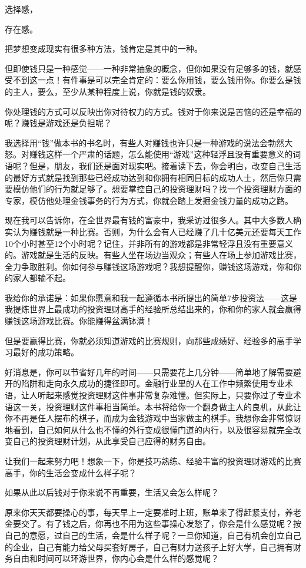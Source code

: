 选择感，

存在感。

把梦想变成现实有很多种方法，钱肯定是其中的一种。

但即使钱只是一种感觉——一种非常抽象的概念，但你如果没有足够多的钱，就感受不到这一点！有件事是可以完全肯定的：要么你用钱，要么钱用你。你要么是钱的主人，要么，至少从某种程度上说，你就是钱的奴隶。

你处理钱的方式可以反映出你对待权力的方式。钱对于你来说是苦恼的还是幸福的呢？赚钱是游戏还是负担呢？

我选择用“钱”做本书的书名时，有些人对赚钱也许只是一种游戏的说法会勃然大怒。对赚钱这样一个严肃的话题，怎么能使用“游戏”这种轻浮且没有重要意义的词语呢？但是，朋友，我们还是面对现实吧。接着读下去，你会明白，改变自己生活的最好方式就是找到那些已经成功达到和你拥有相同目标的成功人士，然后你只需要模仿他们的行为就足够了。想要掌控自己的投资理财吗？找一个投资理财方面的专家，模仿他处理金钱事务的行为方式，你就会踏上发掘金钱力量的成功之路。

现在我可以告诉你，在全世界最有钱的富豪中，我采访过很多人。其中大多数人确实认为赚钱就是一种比赛。否则，为什么会有人已经赚了几十亿美元还要每天工作10个小时甚至12个小时呢？记住，并非所有的游戏都是非常轻浮且没有重要意义的。游戏就是生活的反映。有些人坐在场边当观众；有些人在场上参加游戏比赛，全力争取胜利。你如何参与赚钱这场游戏呢？我想提醒你，赚钱这场游戏，你和你的家人都输不起。

我给你的承诺是：如果你愿意和我一起遵循本书所提出的简单7步投资法——这是我提炼世界上最成功的投资理财高手的经验所总结出来的，你和你的家人就会赢得赚钱这场游戏比赛。你能赚得盆满钵满！

但是要赢得比赛，你就必须知道游戏的比赛规则，向那些成绩好、经验多的高手学习最好的成功策略。

好消息是，你可以节省好几年的时间——只需要花上几分钟——简单地了解需要避开的陷阱和走向永久成功的捷径即可。金融行业里的人在工作中频繁使用专业术语，让人听起来感觉投资理财这件事非常复杂难懂。但实际上，只要你过了专业术语这一关，投资理财这件事相当简单。本书将给你一个翻身做主人的良机，从此让你不再是任人摆布的棋子，而成为金钱游戏中当家做主的棋手。我想你会非常惊讶地看到，自己如何从什么也不懂的外行变成很懂门道的内行，以及很容易就完全改变自己的投资理财计划，从此享受自己应得的财务自由。

让我们一起来努力吧！想象一下，你是技巧熟练、经验丰富的投资理财游戏的比赛高手，你的生活会变成什么样子呢？

如果从此以后钱对于你来说不再重要，生活又会怎么样呢？

原来你天天都要操心的事，每天早上一定要准时上班，账单来了得赶紧支付，养老金要交了。有了钱之后，你再也不用为这些事操心发愁了，你会是什么感觉呢？按自己的意愿，过自己的生活，会是什么样子呢？一旦你知道，自己有机会创立自己的企业，自己有能力给父母买套好房子，自己有财力送孩子上好大学，自己拥有财务自由和时间可以环游世界，你内心会是什么样的感觉呢？

